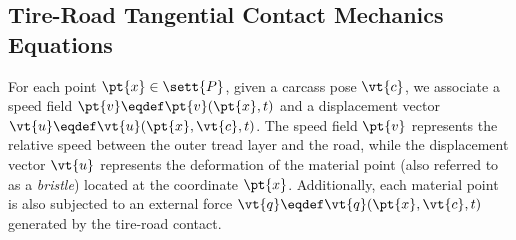 \subsection{Tire-Road Tangential Contact Mechanics Equations}

For each point $\pt{x} \in \sett{P}$, given a carcass pose $\vt{c}$, we associate a speed field $\pt{v} \eqdef \pt{v}(\pt{x}, t)$ and a displacement vector $\vt{u} \eqdef \vt{u}(\pt{x}, \vt{c}, t)$. The speed field $\pt{v}$ represents the relative speed between the outer tread layer and the road, while the displacement vector $\vt{u}$ represents the deformation of the material point (also referred to as a \emph{bristle}) located at the coordinate $\pt{x}$. Additionally, each material point is also subjected to an external force $\vt{q} \eqdef \vt{q}(\pt{x}, \vt{c}, t)$ generated by the tire-road contact.

